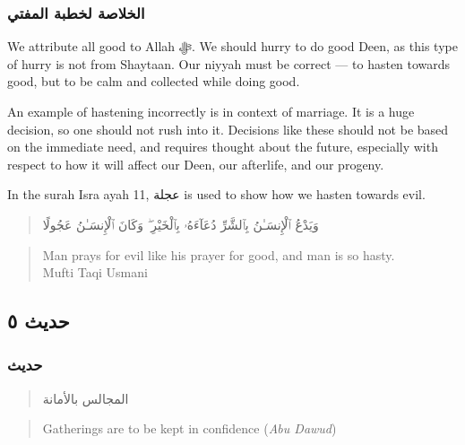 \documentclass[
]{book}
\begin{document}
\hypertarget{ux627ux644ux62eux644ux627ux635ux629-ux644ux62eux637ux628ux629-ux627ux644ux645ux641ux62aux64a-3}{%
\subsubsection{الخلاصة لخطبة المفتي}\label{ux627ux644ux62eux644ux627ux635ux629-ux644ux62eux637ux628ux629-ux627ux644ux645ux641ux62aux64a-3}}

We attribute all good to Allah ﷻ. We should hurry to do good Deen, as this type of hurry is not from Shaytaan. Our niyyah must be correct --- to hasten towards good, but to be calm and collected while doing good.

An example of hastening incorrectly is in context of marriage. It is a huge decision, so one should not rush into it. Decisions like these should not be based on the immediate need, and requires thought about the future, especially with respect to how it will affect our Deen, our afterlife, and our progeny.

In the surah Isra ayah 11, عجلة is used to show how we hasten towards evil.

\begin{quote}
وَيَدْعُ ٱلْإِنسَـٰنُ بِٱلشَّرِّ دُعَآءَهُۥ بِٱلْخَيْرِ ۖ وَكَانَ ٱلْإِنسَـٰنُ عَجُولًا
\end{quote}

\begin{quote}
Man prays for evil like his prayer for good, and man is so hasty.\\
Mufti Taqi Usmani
\end{quote}

\hypertarget{ux62dux62fux64aux62b-ux665}{%
\subsection{حديث ٥}\label{ux62dux62fux64aux62b-ux665}}

\hypertarget{ux62dux62fux64aux62b-4}{%
\subsubsection{حديث}\label{ux62dux62fux64aux62b-4}}

\begin{quote}
المجالس بالأمانة
\end{quote}

\begin{quote}
Gatherings are to be kept in confidence (\emph{Abu Dawud})
\end{quote}
\end{document}
